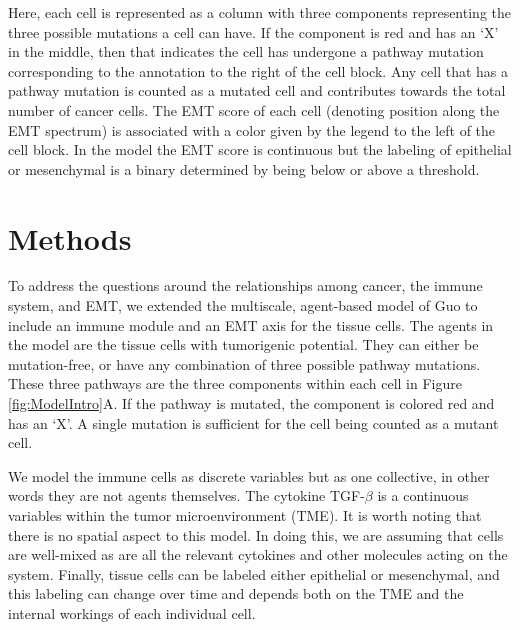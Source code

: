 \documentclass[11pt, a4paper, preprint]{article}
\begin{document}

Here, each cell is represented as a column with three components representing the three possible mutations a cell can have.
If the component is red and has an `X' in the middle, then that indicates the cell has undergone a pathway mutation corresponding to the annotation to the right of the cell block.
Any cell that has a pathway mutation is counted as a mutated cell and contributes towards the total number of cancer cells.
The EMT score of each cell (denoting position along the EMT spectrum) is associated with a color given by the legend to the left of the cell block. 
In the model the EMT score is continuous but the labeling of epithelial or mesenchymal is a binary determined by being below or above a threshold.

\section{Methods}
To address the questions around the relationships among cancer, the immune system, and EMT, we extended the multiscale, agent-based model of Guo to include an immune module and an EMT axis for the tissue cells.
The agents in the model are the tissue cells with tumorigenic potential.
They can either be mutation-free, or have any combination of three possible pathway mutations.
These three pathways are the three components within each cell in Figure \ref{fig:ModelIntro}A.
If the pathway is mutated, the component is colored red and has an `X'.
A single mutation is sufficient for the cell being counted as a mutant cell.

We model the immune cells as discrete variables but as one collective, in other words they are not agents themselves.
The cytokine TGF-$\beta$ is a continuous variables within the tumor microenvironment (TME).
It is worth noting that there is no spatial aspect to this model.
In doing this, we are assuming that cells are well-mixed as are all the relevant cytokines and other molecules acting on the system.
Finally, tissue cells can be labeled either epithelial or mesenchymal, and this labeling can change over time and depends both on the TME and the internal workings of each individual cell.
\end{document}
